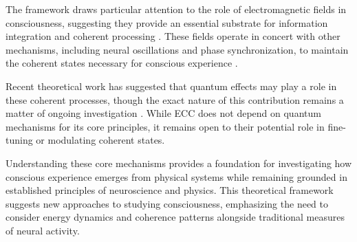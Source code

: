 The framework draws particular attention to the role of electromagnetic fields in consciousness, suggesting they provide an essential substrate for information integration and coherent processing \cite{mcfadden2020integrating, pockett2012electromagnetic}. These fields operate in concert with other mechanisms, including neural oscillations and phase synchronization, to maintain the coherent states necessary for conscious experience \cite{brunel2003what}.

Recent theoretical work has suggested that quantum effects may play a role in these coherent processes, though the exact nature of this contribution remains a matter of ongoing investigation \cite{hameroff2014consciousness2dup}. While ECC does not depend on quantum mechanisms for its core principles, it remains open to their potential role in fine-tuning or modulating coherent states.

Understanding these core mechanisms provides a foundation for investigating how conscious experience emerges from physical systems while remaining grounded in established principles of neuroscience and physics. This theoretical framework suggests new approaches to studying consciousness, emphasizing the need to consider energy dynamics and coherence patterns alongside traditional measures of neural activity.